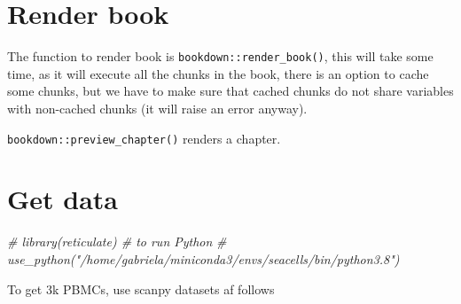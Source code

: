 \documentclass[
]{book}
\newenvironment{Shaded}{\begin{snugshade}}{\end{snugshade}}
\newcommand{\CommentTok}[1]{\textcolor[rgb]{0.56,0.35,0.01}{\textit{#1}}}
\begin{document}
\hypertarget{render-book}{%
\section{Render book}\label{render-book}}

The function to render book is \texttt{bookdown::render\_book()}, this will take some time, as it will execute all the chunks in the book, there is an option to cache some chunks, but we have to make sure that cached chunks do not share variables with non-cached chunks (it will raise an error anyway).

\texttt{bookdown::preview\_chapter()} renders a chapter.

\hypertarget{get-data}{%
\section{Get data}\label{get-data}}

\begin{Shaded}
\begin{Highlighting}[]
\CommentTok{\# library(\textquotesingle{}reticulate\textquotesingle{}) \# to run Python}
\CommentTok{\# use\_python("/home/gabriela/miniconda3/envs/seacells/bin/python3.8")}
\end{Highlighting}
\end{Shaded}

To get 3k PBMCs, use scanpy datasets af follows
\end{document}
